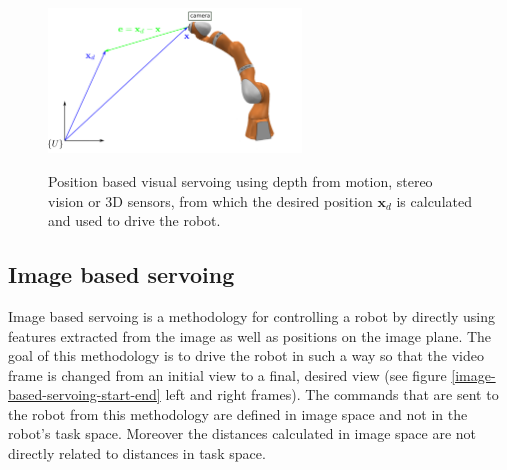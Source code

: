 \begin{center}
\begin{figure}[H]
\centering
\includegraphics[width=0.6\textwidth]{images/visual-servoing-position-based2.png}\\
\caption{Position based visual servoing using depth from motion, stereo vision or 3D sensors, from which the desired position $\mathbf{x}_d$ is calculated and 
used to drive the robot.}
\end{figure}
\end{center}

\subsection{Image based servoing}

Image based servoing is a methodology for controlling a robot by directly using features extracted from the image as well as positions on the image plane. The goal of this methodology is 
to drive the robot in such a way so that the video frame is changed from an initial view to a final, desired view (see figure \ref{image-based-servoing-start-end} left and right frames). The commands 
that are sent to the robot from this methodology are defined in image space and not in the robot's task space. Moreover the distances calculated in image space are not directly related to distances 
in task space.

